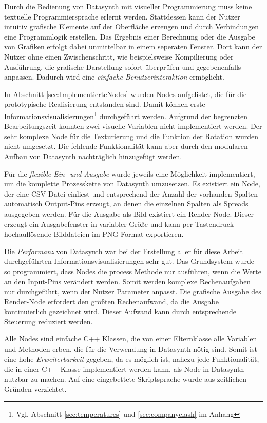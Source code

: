 \documentclass[a4paper, 
               12pt,
               DIV=calc,
               version=first,
               pdftex,
               headsepline,
               footsepline,
               bibliography=totocnumbered,
               listof=numbered]{scrreprt}
\begin{document}
Durch die Bedienung von Datasynth mit visueller Programmierung muss keine
textuelle Programmiersprache erlernt werden. Stattdessen kann der Nutzer intuitiv
grafische Elemente auf der Oberfläche erzeugen und durch Verbindungen
eine Programmlogik erstellen. Das Ergebnis einer Berechnung oder die Ausgabe von
Grafiken erfolgt dabei unmittelbar in einem seperaten Fenster. Dort kann der Nutzer
ohne einen Zwischenschritt, wie beispielsweise Kompilierung oder Ausführung,
die grafische Darstellung sofort überprüfen und gegebenenfalls anpassen. Dadurch wird eine
\textit{einfache Benutzerinteraktion} ermöglicht.

In Abschnitt \ref{sec:ImplementierteNodes} wurden Nodes aufgelistet,
die für die prototypische Realisierung entstanden sind. Damit können erste Informationsvisualisierungen\footnote{Vgl. Abschnitt
\ref{sec:temperatures} und \ref{sec:companyclash} im Anhang} durchgeführt werden.
Aufgrund der begrenzten Bearbeitungszeit konnten zwei visuelle
Variablen nicht implementiert werden. Der sehr komplexe Node für die Texturierung
und die Funktion der Rotation wurden nicht umgesetzt. Die fehlende Funktionalität kann aber
durch den modularen Aufbau von Datasynth nachträglich hinzugefügt werden.

Für die \textit{flexible Ein- und Ausgabe} wurde jeweils eine Möglichkeit implementiert, um die komplette
Prozesskette von Datasynth umzusetzen. Es existiert ein Node, der eine
CSV-Datei einliest und entsprechend der Anzahl der vorhanden
Spalten automatisch Output-Pins erzeugt, an denen die einzelnen Spalten als
Spreads ausgegeben werden. Für die Ausgabe als Bild existiert ein Render-Node.
Dieser erzeugt ein Ausgabefenster in variabler Größe und kann per Tastendruck
hochauflösende Bilddateien im PNG-Format exportieren.

Die \textit{Performanz} von Datasynth war bei der Erstellung aller für diese Arbeit durchgeführten
Informationsvisualisierungen sehr gut. Das Grundsystem wurde so
programmiert, dass Nodes die process Methode nur ausführen, wenn die Werte
an den Input-Pins verändert werden. Somit werden komplexe Rechenaufgaben nur
durchgeführt, wenn der Nutzer Parameter anpasst. Die grafische Ausgabe
des Render-Node erfordert den größten Rechenaufwand, da die Ausgabe kontinuierlich
gezeichnet wird. Dieser Aufwand kann durch entsprechende Steuerung
reduziert werden.

Alle Nodes sind einfache C++ Klassen, die von einer Elternklasse
alle Variablen und Methoden erben, die für die Verwendung in Datasynth
nötig sind. Somit ist eine hohe \textit{Erweiterbarkeit} gegeben, da es möglich ist,
nahezu jede Funktionalität, die in einer C++ Klasse implementiert werden kann,
als Node in Datasynth nutzbar zu machen. Auf eine eingebettete
Skriptsprache wurde aus zeitlichen Gründen verzichtet.
\end{document}
